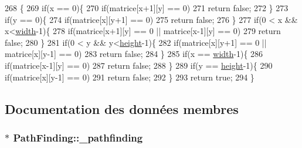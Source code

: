 \begin{DoxyCode}
268                                                               \{
269         \textcolor{keywordflow}{if}(x == 0)\{
270             \textcolor{keywordflow}{if}(matrice[x+1][y] == 0)
271                 \textcolor{keywordflow}{return} \textcolor{keyword}{false};
272         \}
273         \textcolor{keywordflow}{if}(y == 0)\{
274             \textcolor{keywordflow}{if}(matrice[x][y+1] == 0)
275                 \textcolor{keywordflow}{return} \textcolor{keyword}{false};
276         \}
277         \textcolor{keywordflow}{if}(0 < x && x<\hyperlink{classPathFinding_a50f9513402ad1113678635c3eb9da62d}{width}-1)\{
278             \textcolor{keywordflow}{if}(matrice[x+1][y] == 0 || matrice[x-1][y] == 0)
279                 \textcolor{keywordflow}{return} \textcolor{keyword}{false};
280         \}
281         \textcolor{keywordflow}{if}(0 < y && y<\hyperlink{classPathFinding_a61e5643d7459d24b07306a6886348ca1}{height}-1)\{
282             \textcolor{keywordflow}{if}(matrice[x][y+1] == 0 || matrice[x][y-1] == 0)
283                 \textcolor{keywordflow}{return} \textcolor{keyword}{false};
284         \}
285         \textcolor{keywordflow}{if}(x == \hyperlink{classPathFinding_a50f9513402ad1113678635c3eb9da62d}{width}-1)\{
286             \textcolor{keywordflow}{if}(matrice[x-1][y] == 0)
287                 \textcolor{keywordflow}{return} \textcolor{keyword}{false};
288         \}
289         \textcolor{keywordflow}{if}(y == \hyperlink{classPathFinding_a61e5643d7459d24b07306a6886348ca1}{height}-1)\{
290             \textcolor{keywordflow}{if}(matrice[x][y-1] == 0)
291                 \textcolor{keywordflow}{return} \textcolor{keyword}{false};
292         \}
293         \textcolor{keywordflow}{return} \textcolor{keyword}{true};
294     \}
\end{DoxyCode}


\subsection{Documentation des données membres}
\hypertarget{classPathFinding_ada148538e4a78dcc97f24ae74156abd4}{
\subsubsection[{\-\_\-pathfinding}]{$\ast$ Path\-Finding\-::\-\_\-pathfinding\hspace{0.3cm}{\ttfamily [private]}}}\label{classPathFinding_ada148538e4a78dcc97f24ae74156abd4}


